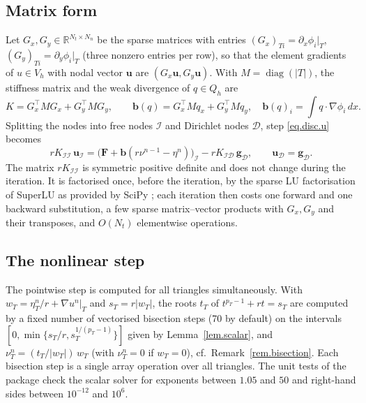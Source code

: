 \documentclass[11pt]{amsart}
\newcommand{\R}{\mathbb R}
\newcommand{\dx}{\,dx}
\theoremstyle{definition}
\theoremstyle{remark}
\numberwithin{equation}{section}
\begin{document}
\subsection{Matrix form}
Let $G_x,G_y\in\R^{N_t\times N_n}$ be the sparse matrices with entries $(G_x)_{Ti}=\partial_x\phi_i|_T$, $(G_y)_{Ti}=\partial_y\phi_i|_T$ (three nonzero entries per row), so that the element gradients of $u\in V_h$ with nodal vector $\mathbf u$ are $(G_x\mathbf u,G_y\mathbf u)$. With $M=\operatorname{diag}(|T|)$, the stiffness matrix and the weak divergence of $q\in Q_h$ are
$$
K=G_x^{\top}MG_x+G_y^{\top}MG_y,\qquad \mathbf b(q)=G_x^{\top}Mq_x+G_y^{\top}Mq_y,\quad \mathbf b(q)_i=\int q\cdot\nabla\phi_i\dx .
$$
Splitting the nodes into free nodes $\mathcal I$ and Dirichlet nodes $\mathcal D$, step \eqref{eq.disc.u} becomes
\begin{equation}\label{eq.linear.system}
rK_{\mathcal I\mathcal I}\,\mathbf u_{\mathcal I}=\big(\mathbf F+\mathbf b(r\nu^{n-1}-\eta^n)\big)_{\mathcal I}-rK_{\mathcal I\mathcal D}\,\mathbf g_{\mathcal D},\qquad \mathbf u_{\mathcal D}=\mathbf g_{\mathcal D}.
\end{equation}
The matrix $rK_{\mathcal I\mathcal I}$ is symmetric positive definite and does not change during the iteration. It is factorised once, before the iteration, by the sparse LU factorisation of SuperLU \cite{Li} as provided by SciPy \cite{SciPy}; each iteration then costs one forward and one backward substitution, a few sparse matrix--vector products with $G_x,G_y$ and their transposes, and $O(N_t)$ elementwise operations.

\subsection{The nonlinear step}
The pointwise step is computed for all triangles simultaneously. With $w_T=\eta^n_T/r+\nabla u^n|_T$ and $s_T=r|w_T|$, the roots $t_T$ of $t^{p_T-1}+rt=s_T$ are computed by a fixed number of vectorised bisection steps (70 by default) on the intervals $[0,\min\{s_T/r,s_T^{1/(p_T-1)}\}]$ given by Lemma~\ref{lem.scalar}, and $\nu^n_T=(t_T/|w_T|)\,w_T$ (with $\nu^n_T=0$ if $w_T=0$), cf.\ Remark~\ref{rem.bisection}. Each bisection step is a single array operation over all triangles. The unit tests of the package check the scalar solver for exponents between $1.05$ and $50$ and right-hand sides between $10^{-12}$ and $10^6$.
\end{document}
